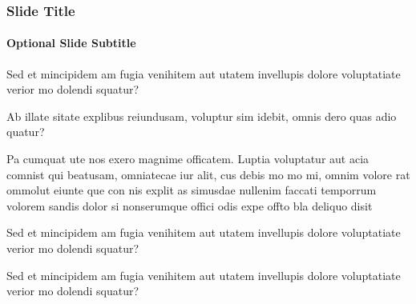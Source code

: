 \documentclass[
	aspectratio=169, %
	t, %
	onlytextwidth, %
	10pt, %
]{beamer}
\begin{document}
\begin{frame}
	\frametitle{Slide Title}
	\framesubtitle{Optional Slide Subtitle}
	
	\begin{adjustwidth}{0cm}{0.35\textwidth} %
		Sed et mincipidem am fugia venihitem aut utatem invellupis dolore voluptatiate verior mo dolendi squatur?

		Ab illate sitate explibus reiundusam, voluptur sim idebit, omnis dero quas adio quatur?

		Pa cumquat ute nos exero magnime officatem. Luptia voluptatur aut acia comnist qui beatusam, omniatecae iur alit, cus debis mo mo mi, omnim volore rat ommolut eiunte que con nis explit as simusdae nullenim faccati temporrum volorem sandis dolor si nonserumque offici odis expe offto bla deliquo disit
	\end{adjustwidth}
\end{frame}


\begin{frame}
	\begin{adjustwidth}{0cm}{0.15\textwidth} %
		{\Huge\textcolor{ICLBlue}{{\ImperialSansSemiBold Sed et mincipidem am fugia venihitem aut utatem invellupis dolore voluptatiate verior mo dolendi squatur?}}}
	\end{adjustwidth}
\end{frame}


\begingroup
	
	\begin{frame}
		\begin{adjustwidth}{0cm}{0.15\textwidth} %
			{\Huge{\ImperialSansSemiBold Sed et mincipidem am fugia venihitem aut utatem invellupis dolore voluptatiate verior mo dolendi squatur?}}
		\end{adjustwidth}
	\end{frame}
\endgroup
\end{document}

